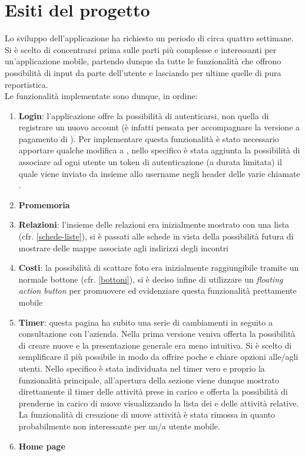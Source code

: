 \section{Esiti del progetto}\label{esiti}

Lo sviluppo dell'applicazione ha richiesto un periodo di circa quattro settimane.
Si è scelto di concentrarsi prima sulle parti più complesse e interessanti per
un'applicazione mobile, partendo dunque da tutte le funzionalità che offrono possibilità
di input da parte dell'utente e lasciando per ultime quelle di pura reportistica. \\

Le funzionalità implementate sono dunque, in ordine:

\begin{enumerate}
\item \textbf{Login}: l'applicazione offre la possibilità di autenticarsi, non quella
di registrare un nuovo account (è infatti pensata per accompagnare la versione a
pagamento di \fiscoloWeb). Per implementare questa funzionalità è stato necessario
apportare qualche modifica a \fiscoloWeb{}, nello specifico è stata aggiunta la possibilità
di associare ad ogni utente un token di autenticazione (a durata limitata) il quale viene
inviato da \fiscoloMobile{} insieme allo username negli header delle varie chiamate .
\item \textbf{Promemoria}
\item \textbf{Relazioni}: l'insieme delle relazioni era inizialmente mostrato con una
lista (cfr. \ref{schede-liste}), si è passati alle schede in vista della possibilità
futura di mostrare delle mappe associate agli indirizzi degli incontri
\item \textbf{Costi}: la possibilità di scattare foto era inizialmente raggiungibile tramite
un normale bottone (cfr. \ref{bottoni}), si è deciso infine di utilizzare un
\textit{floating action button} per promuovere ed evidenziare questa funzionalità
prettamente mobile
\item \textbf{Timer}: questa pagina ha subito una serie di cambiamenti in seguito a
consultazione con l'azienda. Nella prima versione veniva offerta la possibilità di creare
nuove  e la presentazione generale era meno intuitiva. Si è scelto di semplificare
il più possibile in modo da offrire poche e chiare opzioni alle/agli utenti. Nello specifico
è stata individuata nel timer vero e proprio la funzionalità principale, all'apertura della
sezione viene dunque mostrato direttamente il timer delle attività prese in carico e offerta
la possibilità di prenderne in carico di nuove visualizzando la lista dei  e delle
attività relative. La funzionalità di creazione di nuove attività è stata rimossa in quanto
probabilmente non interessante per un/a utente mobile.
\item \textbf{Home page}
\end{enumerate}

